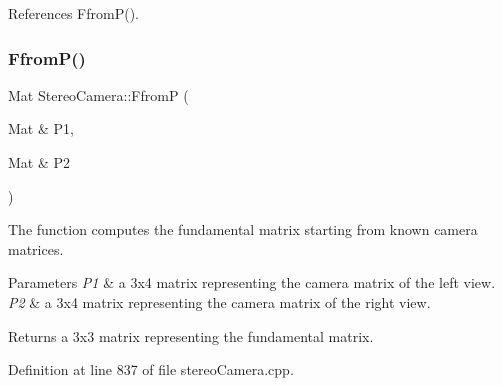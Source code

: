 References Ffrom\+P().

\mbox{\label{classStereoCamera_a3fe4e87322f8644cd21ce06e8522c815}} 
\subsubsection{\texorpdfstring{FfromP()}{FfromP()}}
{\footnotesize\ttfamily Mat Stereo\+Camera\+::\+FfromP (\begin{DoxyParamCaption}\item[{Mat \&}]{P1,  }\item[{Mat \&}]{P2 }\end{DoxyParamCaption})}



The function computes the fundamental matrix starting from known camera matrices. 


\begin{DoxyParams}{Parameters}
{\em P1} & a 3x4 matrix representing the camera matrix of the left view. \\
\hline
{\em P2} & a 3x4 matrix representing the camera matrix of the right view. \\
\hline
\end{DoxyParams}
\begin{DoxyReturn}{Returns}
a 3x3 matrix representing the fundamental matrix. 
\end{DoxyReturn}


Definition at line 837 of file stereo\+Camera.\+cpp.


